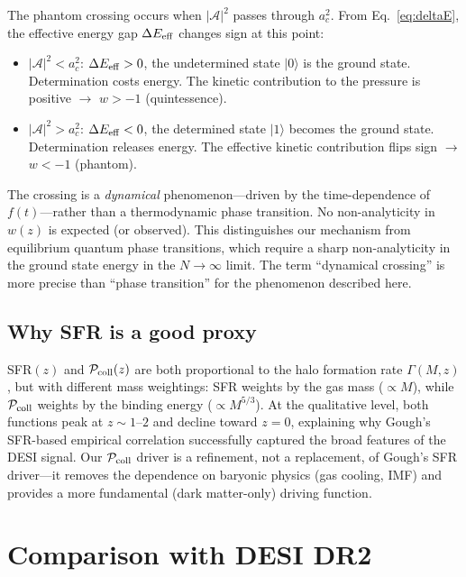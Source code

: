 \documentclass[aps,prd,twocolumn,superscriptaddress]{revtex4-2}
\begin{document}
The phantom crossing occurs when $|\mathcal{A}|^2$ passes through $a_c^2$. From Eq.~\eqref{eq:deltaE}, the effective energy gap $\Delta E_{\rm eff}$ changes sign at this point:

\begin{itemize}
\item $|\mathcal{A}|^2 < a_c^2$: $\Delta E_{\rm eff} > 0$, the undetermined state $|0\rangle$ is the ground state. Determination costs energy. The kinetic contribution to the pressure is positive $\to$ $w > -1$ (quintessence).
\item $|\mathcal{A}|^2 > a_c^2$: $\Delta E_{\rm eff} < 0$, the determined state $|1\rangle$ becomes the ground state. Determination releases energy. The effective kinetic contribution flips sign $\to$ $w < -1$ (phantom).
\end{itemize}

The crossing is a \emph{dynamical} phenomenon---driven by the time-dependence of $f(t)$---rather than a thermodynamic phase transition. No non-analyticity in $w(z)$ is expected (or observed). This distinguishes our mechanism from equilibrium quantum phase transitions, which require a sharp non-analyticity in the ground state energy in the $N \to \infty$ limit. The term ``dynamical crossing'' is more precise than ``phase transition'' for the phenomenon described here.

\subsection{Why SFR is a good proxy}
\label{sec:sfrproxy}

SFR$(z)$ and $\mathcal{P}_{\rm coll}(z)$ are both proportional to the halo formation rate $\Gamma(M,z)$, but with different mass weightings: SFR weights by the gas mass ($\propto M$), while $\mathcal{P}_{\rm coll}$ weights by the binding energy ($\propto M^{5/3}$). At the qualitative level, both functions peak at $z \sim 1$--$2$ and decline toward $z=0$, explaining why Gough's SFR-based empirical correlation \cite{Gough:2025} successfully captured the broad features of the DESI signal. Our $\mathcal{P}_{\rm coll}$ driver is a refinement, not a replacement, of Gough's SFR driver---it removes the dependence on baryonic physics (gas cooling, IMF) and provides a more fundamental (dark matter-only) driving function.

\section{Comparison with DESI DR2}
\label{sec:desi}
\end{document}
